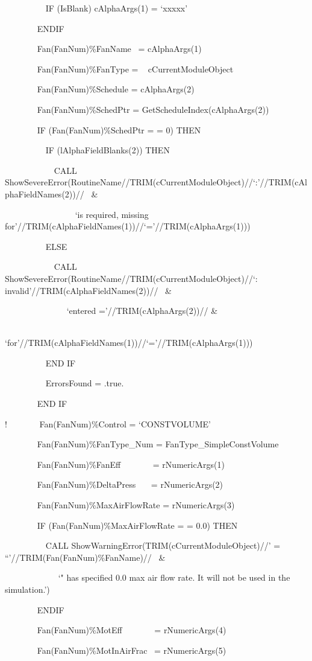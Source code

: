 ~~~~~~~~~ IF (IsBlank) cAlphaArgs(1) = `xxxxx'

~~~~~~~ ENDIF

~~~~~~~ Fan(FanNum)\%FanName~ = cAlphaArgs(1)

~~~~~~~ Fan(FanNum)\%FanType = ~ cCurrentModuleObject

~~~~~~~ Fan(FanNum)\%Schedule = cAlphaArgs(2)

~~~~~~~ Fan(FanNum)\%SchedPtr = GetScheduleIndex(cAlphaArgs(2))

~~~~~~~ IF (Fan(FanNum)\%SchedPtr = = 0) THEN

~~~~~~~~~ IF (lAlphaFieldBlanks(2)) THEN

~~~~~~~~~~~ CALL ShowSevereError(RoutineName//TRIM(cCurrentModuleObject)//`:'//TRIM(cAlphaFieldNames(2))//~ \&

~~~~~~~~~~~~~~~~ `is required, missing for'//TRIM(cAlphaFieldNames(1))//`='//TRIM(cAlphaArgs(1)))

~~~~~~~~~ ELSE

~~~~~~~~~~~ CALL ShowSevereError(RoutineName//TRIM(cCurrentModuleObject)//`: invalid'//TRIM(cAlphaFieldNames(2))//~ \&

~~~~~~~~~~~~~~ `entered ='//TRIM(cAlphaArgs(2))// \&

~~~~~~~~~~~~~~ `for'//TRIM(cAlphaFieldNames(1))//`='//TRIM(cAlphaArgs(1)))

~~~~~~~~~ END IF

~~~~~~~~~ ErrorsFound = .true.

~~~~~~~ END IF

!~~~~~~~ Fan(FanNum)\%Control = `CONSTVOLUME'

~~~~~~~ Fan(FanNum)\%FanType\_Num = FanType\_SimpleConstVolume

~~~~~~~ Fan(FanNum)\%FanEff~~~~~~~ = rNumericArgs(1)

~~~~~~~ Fan(FanNum)\%DeltaPress~~~ = rNumericArgs(2)

~~~~~~~ Fan(FanNum)\%MaxAirFlowRate = rNumericArgs(3)

~~~~~~~ IF (Fan(FanNum)\%MaxAirFlowRate = = 0.0) THEN

~~~~~~~~~ CALL ShowWarningError(TRIM(cCurrentModuleObject)//' = ``'//TRIM(Fan(FanNum)\%FanName)//~ \&

~~~~~~~~~~~~ `" has specified 0.0 max air flow rate. It will not be used in the simulation.')

~~~~~~~ ENDIF

~~~~~~~ Fan(FanNum)\%MotEff~~~~~~~ = rNumericArgs(4)

~~~~~~~ Fan(FanNum)\%MotInAirFrac~ = rNumericArgs(5)

